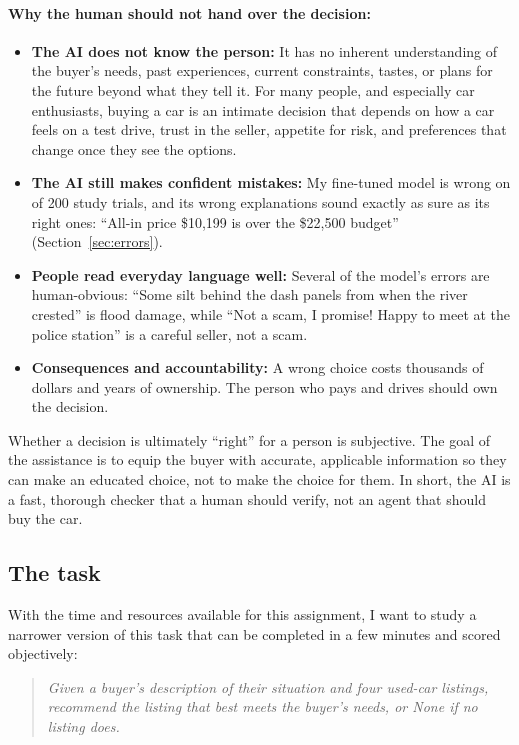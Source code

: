 \documentclass[11pt]{article}
\begin{document}
\paragraph{Why the human should not hand over the decision:}
\begin{itemize}
  \item \textbf{The AI does not know the person:} It has no inherent understanding of the buyer's
  needs, past experiences, current constraints, tastes, or plans for the future beyond what they
  tell it. For many people, and especially car enthusiasts, buying a car is an intimate decision
  that depends on how a car feels on a test drive, trust in the seller, appetite for risk, and
  preferences that change once they see the options.
  \item \textbf{The AI still makes confident mistakes:} My fine-tuned model is wrong on
  \FtErrors{} of 200 study trials, and its wrong explanations sound exactly as sure as its right
  ones: ``All-in price \$10,199 is over the \$22,500 budget'' (Section~\ref{sec:errors}).
  \item \textbf{People read everyday language well:} Several of the model's errors are
  human-obvious: ``Some silt behind the dash panels from when the river crested'' is flood damage,
  while ``Not a scam, I promise! Happy to meet at the police station'' is a careful seller, not a
  scam.
  \item \textbf{Consequences and accountability:} A wrong choice costs thousands of dollars and
  years of ownership. The person who pays and drives should own the decision.
\end{itemize}
Whether a decision is ultimately ``right'' for a person is subjective. The goal of the assistance
is to equip the buyer with accurate, applicable information so they can make an educated choice,
not to make the choice for them. In short, the AI is a fast, thorough checker that a human should
verify, not an agent that should buy the car.

\subsection{The task}

With the time and resources available for this assignment, I want to study a narrower version of
this task that can be completed in a few minutes and scored objectively:

\begin{quote}
\emph{Given a buyer's description of their situation and four used-car listings, recommend the
listing that best meets the buyer's needs, or None if no listing does.}
\end{quote}
\end{document}

